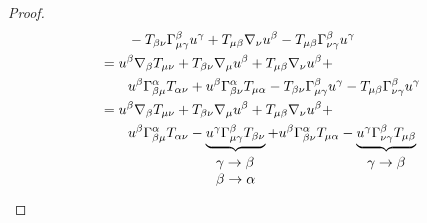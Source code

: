 \begin{proof}
\begin{equation}
\begin{aligned}
                                      & \qquad  - T_{\beta \nu}\Gamma^\beta_{\mu \gamma} u^\gamma +T_{\mu \beta } \mathbf{\nabla}_\nu u^\beta -  T_{\mu \beta } \Gamma^\beta_{\nu \gamma} u^\gamma                                                                                                                           \\
                                      & = u^\beta \mathbf{\nabla}_\beta T_{\mu \nu}+T_{\beta \nu}\mathbf{\nabla}_\mu u^\beta +T_{\mu \beta } \mathbf{\nabla}_\nu u^\beta +                                                                                                                                                             \\
                                      & \qquad u^\beta \Gamma_{\beta \mu}^\alpha T_{\alpha \nu} + u^\beta \Gamma_{\beta \nu}^\alpha T_{\mu \alpha}- T_{\beta \nu}\Gamma^\beta_{\mu \gamma} u^\gamma  -  T_{\mu \beta } \Gamma^\beta_{\nu \gamma} u^\gamma                                                               \\
                                      & = u^\beta \mathbf{\nabla}_\beta T_{\mu \nu}+T_{\beta \nu}\mathbf{\nabla}_\mu u^\beta +T_{\mu \beta } \mathbf{\nabla}_\nu u^\beta +                                                                                                                                                             \\
                                      & \qquad u^\beta \Gamma_{\beta \mu}^\alpha T_{\alpha \nu}- \underbrace{u^\gamma\Gamma^\beta_{\mu \gamma}T_{\beta \nu}}_{\begin{array}{l}
                                                                                                                                                                  \gamma \rightarrow \beta \\
                                                                                                                                                                  \beta \rightarrow \alpha
                                                                                                                                                              \end{array}}  + u^\beta \Gamma_{\beta \nu}^\alpha T_{\mu \alpha}- \underbrace{u^\gamma \Gamma^\beta_{\nu \gamma}T_{\mu \beta }}_{\begin{array}{l}
                                                                                                                                                                                                                                                                                                   \gamma \rightarrow \beta \\

\end{array}}
\end{aligned}
\end{equation}
\end{proof}
